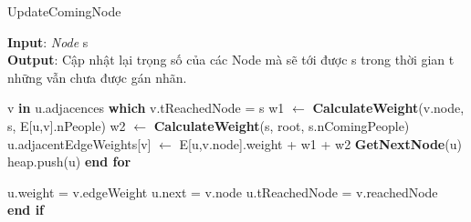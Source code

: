 \documentclass{article}
\begin{document}
    \begin{algorithm}[h!]
        \caption{UpdateComingNode}
        \textbf{Input}: \textit{Node} s \\ 
        \textbf{Output}: Cập nhật lại trọng số của các Node mà sẽ tới được s
        trong thời gian t những vẫn chưa được gán nhãn.
        \begin{algorithmic}
            \State v \textbf{in} u.adjacences \textbf{which} v.tReachedNode = s
            \State w1 $\gets$ \textbf{CalculateWeight}(v.node, s, E[u,v].nPeople)
            \State w2 $\gets$ \textbf{CalculateWeight}(s, root, s.nComingPeople)
            \State u.adjacentEdgeWeights[v] $\gets$ E[u,v.node].weight + w1 + w2
            \State \textbf{GetNextNode}(u)
            \State heap.push(u)
            \EndFor
            \textbf{end for}
            \EndProcedure

            \State u.weight = v.edgeWeight
            \State u.next = v.node
            \State u.tReachedNode = v.reachedNode \\
            \EndIf
            \textbf{end if}
            \EndFor
            \EndProcedure
        \end{algorithmic}
    \end{algorithm}
\end{document}

